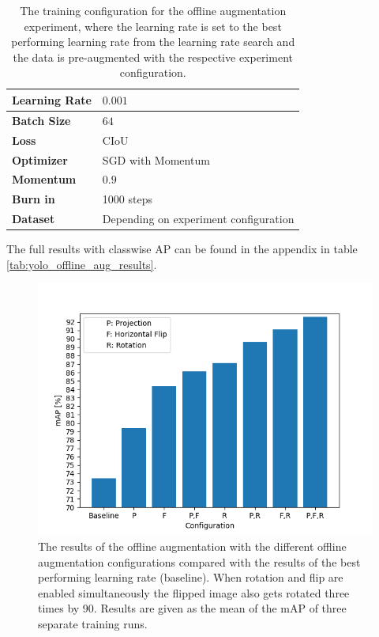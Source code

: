 \begin{table}[H]
\footnotesize
\begin{center}
\begin{tabular}{|l|l|}

\hline
\textbf{Learning Rate} & $0.001$ \\
\hline
\textbf{Batch Size} & $64$\\
\hline
\textbf{Loss} & CIoU \\
\hline
\textbf{Optimizer} & SGD with Momentum \\
\hline
\textbf{Momentum} & $0.9$ \\
\hline
\textbf{Burn in} & 1000 steps \\
\hline
\textbf{Dataset} & Depending on experiment configuration \\
\hline

\end{tabular}
\caption{The training configuration for the offline augmentation experiment, where the learning rate is set to the best performing learning rate from the learning rate search and the data is pre-augmented with the respective experiment configuration.}
\label{tab:yolo_offline_aug_config}
\end{center}
\end{table}

The full results with classwise \ac{AP} can be found in the appendix in table \ref{tab:yolo_offline_aug_results}.
\begin{figure}
\begin{center}
    \includegraphics[width=14cm]{imgs/yolo_offline_aug_experiment.png}
    \caption{The results of the offline augmentation with the different offline augmentation configurations compared with the results of the best performing learning rate (baseline). When rotation and flip are enabled simultaneously the flipped image also gets rotated three times by 90\textdegree. Results are given as the mean of the mAP of three separate training runs.}
    \label{fig:yolo_offline_aug_results}
\end{center}
\end{figure}

